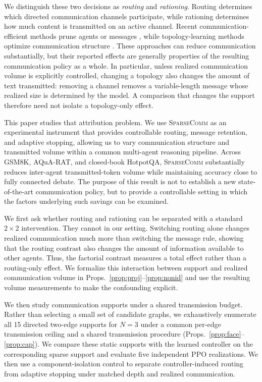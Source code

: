 \documentclass[11pt]{article}
\newcommand{\sys}{\textsc{SparseComm}\xspace}
\begin{document}
We distinguish these two decisions as \emph{routing} and \emph{rationing}.
Routing determines which directed communication channels participate, while
rationing determines how much content is transmitted on an active channel.
Recent communication-efficient methods prune agents or messages
\citep{zhang2025cut,wang-etal-2025-agentdropout}, while topology-learning
methods optimize communication structure
\citep{zhang2025gdesigner,shen-etal-2025-understanding,li2026assemble}.
These approaches can reduce communication substantially, but their reported
effects are generally properties of the resulting communication policy as a
whole. In particular, unless realized communication volume is explicitly
controlled, changing a topology also changes the amount of text transmitted:
removing a channel removes a variable-length message whose realized size is
determined by the model. A comparison that changes the support therefore need
not isolate a topology-only effect.

This paper studies that attribution problem. We use \sys as an experimental
instrument that provides controllable routing, message retention, and adaptive
stopping, allowing us to vary communication structure and transmitted volume
within a common multi-agent reasoning pipeline. Across GSM8K, AQuA-RAT, and
closed-book HotpotQA, \sys substantially reduces inter-agent transmitted-token
volume while maintaining accuracy close to fully connected debate. The purpose
of this result is not to establish a new state-of-the-art communication policy,
but to provide a controllable setting in which the factors underlying such
savings can be examined.

We first ask whether routing and rationing can be separated with a standard
$2\times2$ intervention. They cannot in our setting. Switching routing alone
changes realized communication much more than switching the message rule,
showing that the routing contrast also changes the amount of information
available to other agents. Thus, the factorial contrast measures a total
effect rather than a routing-only effect. We formalize this interaction between
support and realized communication volume in Props.~\ref{prop:proj}--\ref{prop:nonid}
and use the resulting volume measurements to make the confounding explicit.

We then study communication supports under a shared transmission budget.
Rather than selecting a small set of candidate graphs, we exhaustively enumerate
all 15 directed two-edge supports for $N=3$ under a common per-edge transmission
ceiling and a shared transmission procedure
(Props.~\ref{prop:face}--\ref{prop:cap}). We compare these static supports with
the learned controller on the corresponding sparse support and evaluate five
independent PPO realizations. We then use a component-isolation control to
separate controller-induced routing from adaptive stopping under matched depth
and realized communication.
\end{document}
